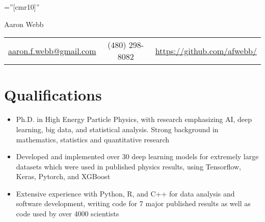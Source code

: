 \documentclass[a4paper,10pt]{article}
\begin{document}
\pagestyle{empty} %

\font\fb=''[cmr10]'' %


\par{\centering
		{\Huge Aaron Webb
	}\par}

\begin{center}
\begin{tabular}{c|c|c}
    \href{mailto:aaron.f.webb@gmail.com}{aaron.f.webb@gmail.com} & (480) 298-8082   & \href{https://github.com/afwebb/}{https://github.com/afwebb/}
\end{tabular}
\end{center}

\section{Qualifications}
\begin{itemize}[leftmargin=*, topsep=2pt]
    \setlength\itemsep{-0.25em}
    \item Ph.D. in High Energy Particle Physics, with research emphasizing AI, deep learning, big data, and statistical analysis. Strong background in mathematics, statistics and quantitative research
    \item Developed and implemented over 30 deep learning models for extremely large datasets which were used in published physics results, using Tensorflow, Keras, Pytorch, and XGBoost
    \item Extensive experience with Python, R, and C++ for data analysis and software development, writing code for 7 major published results as well as code used by over 4000 scientists
\end{itemize}
\end{document}
